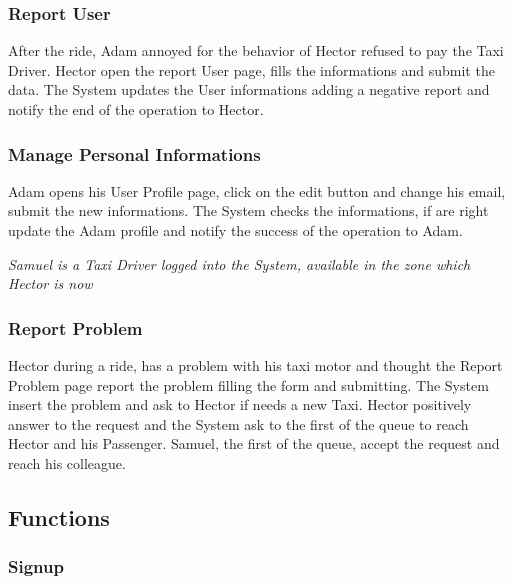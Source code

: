 \documentclass[english]{article}
\begin{document}
\subsubsection{Report User}
After the ride, Adam annoyed for the behavior of Hector refused to pay the Taxi Driver. Hector open the report User page, fills the informations and submit the data. The System updates the User informations adding a negative report and notify the end of the operation to Hector. 

\subsubsection{Manage Personal Informations}
Adam opens his User Profile page, click on the edit button and change his email, submit the new informations. The System checks the informations, if are right update the Adam profile and notify the success of the operation to Adam.

\emph{Samuel is a Taxi Driver logged into the System, available in the zone which Hector is now}

\subsubsection{Report Problem}
Hector during a ride, has a problem with his taxi motor and thought the Report Problem page report the problem filling the form and submitting. The System insert the problem and ask to Hector if needs a new Taxi. Hector positively answer to the request and the System ask to the first of the queue to reach Hector and his Passenger. Samuel, the first of the queue, accept the request and reach his colleague.

\subsection{Functions}

\subsubsection{Signup}
\end{document}
